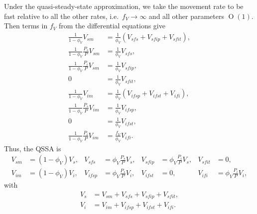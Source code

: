 \documentclass{article}
\begin{document}
Under the quasi-steady-state approximation, we take the movement rate
to be fast relative to all the other rates, i.e.~$f_V \to \infty$ and
all other parameters $\operatorname{O}(1)$.  Then terms in $f_V$ from
the differential equations give
\begin{equation}
  \begin{split}
    \frac{1}{1 - \phi_V} V_{sm} &=
    \frac{1}{\phi_V} (V_{sfs} + V_{sfip} + V_{sfit}),
    \\
    \frac{1}{1 - \phi_V} \frac{P_s}{P} V_{sm} &=
    \frac{1}{\phi_V} V_{sfs},
    \\
    \frac{1}{1 - \phi_V} \frac{P_i}{P} V_{sm} &=
    \frac{1}{\phi_V} V_{sfip},
    \\
    0 &=
    \frac{1}{\phi_V} V_{sfit},
    \\
    \frac{1}{1 - \phi_V} V_{im} &=
    \frac{1}{\phi_V} (V_{ifsp} + V_{ifst} + V_{ifi}),
    \\
    \frac{1}{1 - \phi_V} \frac{P_s}{P} V_{im} &= \frac{1}{\phi_V} V_{ifsp},
    \\
    0 &= \frac{1}{\phi_V} V_{ifst},
    \\
    \frac{1}{1 - \phi_V} \frac{P_i}{P} V_{im} &= \frac{f_V}{\phi_V} V_{ifi}.
  \end{split}
\end{equation}
Thus, the QSSA is
\begin{equation}
  \begin{aligned}
    V_{sm} &= (1 - \phi_V) V_s,
    &
    V_{sfs} &= \phi_V \frac{P_s}{P} V_s,
    &
    V_{sfip} &= \phi_V \frac{P_i}{P} V_s,
    &
    V_{sfit} &= 0,
    \\
    V_{im} &= (1 - \phi_V) V_i,
    &
    V_{ifsp} &= \phi_V \frac{P_s}{P} V_i,
    &
    V_{ifst} &= 0,
    &
    V_{ifi} &= \phi_V \frac{P_i}{P} V_i,
  \end{aligned}
\end{equation}
with
\begin{equation}
  \begin{split}
    V_s &= V_{sm} + V_{sfs} + V_{sfip} + V_{sfit}, \\
    V_i &= V_{im} + V_{ifsp} + V_{ifst} + V_{ifi}.
  \end{split}
\end{equation}
\end{document}
